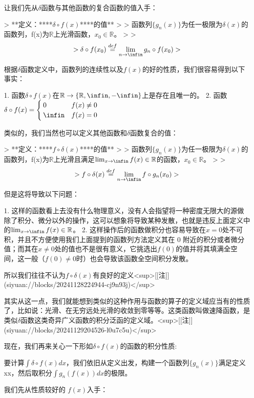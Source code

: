 \documentclass[lang=cn,10pt,newtx,bibend=biber,device=pad]{elegantbook}
\begin{document}
让我们先从$\delta$函数与其他函数的复合函数的值入手：

> **定义：**​**$\delta\circ f(x)$**​**的值**
>
> 函数列$\{g_n(x)\}$为任一极限为$\delta(x)$的函数列，f(x)为$\mathbb{R}$上光滑函数，$x_0\in \mathbb{R}$。
>
> $$
> \delta\circ f(x_0) \overset{def}{=} \lim_{n\rightarrow\infin} g_n\circ f(x_0)
> $$

根据$\delta$函数定义中，函数列的连续性以及$f(x)$的好的性质，我们很容易得到以下事实：

1. 函数$\delta\circ f(x)$在$\mathbb{R}\rightarrow\{\mathbb{R},\infin,-\infin\}$上是存在且唯一的。
2. 函数$\delta\circ f(x) =  \begin{cases} 0&f(x)\neq 0\\ \infin &f(x)=0 \end{cases}$

类似的，我们当然也可以定义其他函数和$\delta$函数复合的值：

> **定义：**​**$f\circ \delta(x)$**​**的值**
>
> 函数列$\{g_n(x)\}$为任一极限为$\delta(x)$的函数列，f(x)为$\mathbb{R}$上光滑且满足$\lim_{x\rightarrow\infin}f(x)\in\mathbb{R}$的函数，$x_0\in \mathbb{R}$。
>
> $$
> f\circ \delta(x) \overset{def}{=} \lim_{n\rightarrow\infin} f\circ g_n(x_0)
> $$

但是这将导致以下问题：

1. 这样的函数看上去没有什么物理意义，没有人会指望将一种密度无限大的源做除了积分、微分以外的操作，这可以想象将导致某种发散，也就是违反上面定义中的$\lim_{x\rightarrow\infin}f(x)\in\mathbb{R}$。
2. 这样操作后的函数做积分也容易导致在$x=0$处不可积，并且不方便使用我们上面提到的函数列方法定义其在 0 附近的积分或者微分值；而其在$x\neq 0$处的值也不是很有意义，它挑选出$f(0)$的值并将其填满全空间，这一般（$f(0)\neq 0$时）也会导致该函数全空间积分发散。

所以我们往往不认为$f\circ \delta(x)$有良好的定义<sup>[[注]](siyuan://blocks/20241128224944-cj9n93j)</sup>

其实从这一点，我们就能想到类似的这种作用与函数的算子的定义域应当有的性质了，比如说：光滑、在无穷远处光滑的收敛到零等等。这类函数叫做速降函数，是类似$\delta$函数这类奇异广义函数的积分泛函的定义域。<sup>[[注]](siyuan://blocks/20241129204526-l0u7c5u)</sup>

现在，我们再来关心一下形如$\delta\circ f(x)$的函数的积分性质:

要计算$\int\delta\circ f(x) dx$，我们依旧从定义出发，构建一个函数列$\{g_n(x)\}$满足定义 xx，然后取积分$\int g_n(f(x)) dx$的极限。

我们先从性质较好的 $f(x)$入手：
\end{document}
